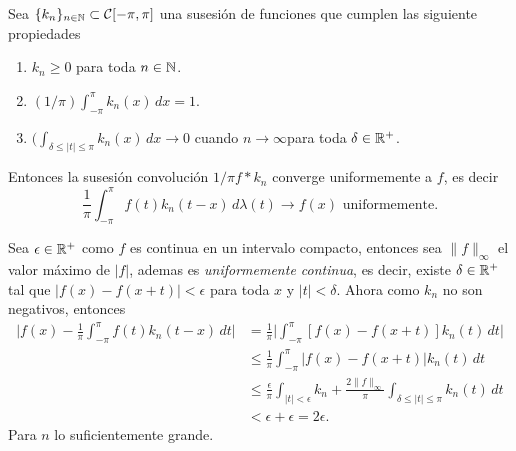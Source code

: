\documentclass[main.tex]{subfiles}
\begin{document}
    \begin{teorema}
      Sea \(\{k_n\}_{n\in \mathbb N }\subset\mathcal{C}[-\pi,\pi]\) una susesión de funciones que cumplen las siguiente propiedades
      \begin{enumerate}
        \item \(k_n\geq 0\) para toda \(n\in \mathbb N \).
        \item \((1/\pi)\int_{-\pi}^{\pi}k_n(x)\,dx=1\).
        \item \((\int_{\delta\leq|t|\leq\pi}k_n(x)\,dx\to0\) cuando \(n\to\infty\)para toda \(\delta\in\mathbb R ^+\).
      \end{enumerate}
      Entonces la  susesión convolución \(1/\pi f*k_n\) converge uniformemente a \(f\), es decir
      \[
      \frac{1}{\pi}\int_{-\pi}^{\pi} f(t)k_{n}(t-x)\,d\lambda(t)\to f(x)\text{ uniformemente.}
      \]
    \end{teorema}
    \dem Sea \(\epsilon\in\mathbb R ^+\) como \(f\) es continua en un intervalo compacto, entonces sea \(\|f\|_{\infty}\) el valor máximo de \(|f|\), ademas es \emph{uniformemente continua}, es decir, existe \(\delta\in\mathbb R ^+\) tal que \(|f(x)-f(x+t)|<\epsilon\) para toda \(x\) y \(|t|<\delta\). Ahora como \(k_n\) no son negativos, entonces
    \begin{align*}
      \bigg|f(x)-\frac{1}{\pi}\int_{-\pi}^{\pi} f(t)k_{n}(t-x)\,dt\bigg|&=
      \frac{1}{\pi}\bigg|\int_{-\pi}^{\pi} [f(x)-f(x+t)]k_{n}(t)\,dt\bigg|\\
      &\leq\frac{1}{\pi}\int_{-\pi}^{\pi} |f(x)-f(x+t)|k_{n}(t)\,dt\\
      &\leq\frac{\epsilon}{\pi}\int_{|t|<\epsilon}k_n+ \frac{2\|f\|_{\infty}}{\pi}\int_{\delta\leq|t|\leq\pi}k_{n}(t)\,dt\\
      & < \epsilon+\epsilon=2\epsilon.
      \end{align*}
    Para \(n\) lo suficientemente grande.
  
\end{document}
